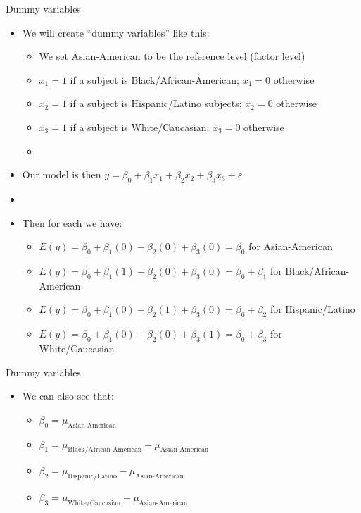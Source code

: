 \documentclass[xcolor=dvipsnames]{beamer}
\begin{document}
\begin{frame}{Dummy variables}
	\begin{itemize}
		\item We will create ``dummy variables'' like this:
		\begin{itemize}
			\item We set Asian-American to be the reference level (factor level)
			\item $x_1 = 1$ if a subject is Black/African-American; $x_1 = 0$ otherwise
			\item $x_2 = 1$ if a subject is Hispanic/Latino subjects; $x_2 = 0$ otherwise
			\item $x_3 = 1$ if a subject is White/Caucasian; $x_3 = 0$ otherwise
			\item[]
		\end{itemize}
	\item Our model is then $y = \beta_0 + \beta_1 x_1 + \beta_2 x_2 + \beta_3 x_3 + \varepsilon$
	\item[]
	\item Then for each we have:
	\begin{itemize}
		\item $E(y) = \beta_0 + \beta_1(0) + \beta_2(0) + \beta_3(0) = \beta_0$ for Asian-American
		\item $E(y) = \beta_0 + \beta_1(1) + \beta_2(0) + \beta_3(0) = \beta_0 + \beta_1$ for Black/African-American
		\item $E(y) = \beta_0 + \beta_1(0) + \beta_2(1) + \beta_3(0) = \beta_0 + \beta_2$ for Hispanic/Latino
		\item $E(y) = \beta_0 + \beta_1(0) + \beta_2(0) + \beta_3(1) = \beta_0 + \beta_3$ for White/Caucasian
	\end{itemize}
	\end{itemize}
\end{frame}

\begin{frame}{Dummy variables}
	\begin{itemize}
		\item We can also see that:
		\begin{itemize}
			\item $\beta_0 = \mu_{\text{Asian-American}}$
			\item $\beta_1 = \mu_{\text{Black/African-American}} -\mu_{\text{Asian-American}}$
			\item $\beta_2 = \mu_{\text{Hispanic/Latino}}- \mu_{\text{Asian-American}}$
			\item $\beta_3 = \mu_{\text{White/Caucasian}} - \mu_{\text{Asian-American}}$
		\end{itemize}
	\end{itemize}
\end{frame}
\end{document}

